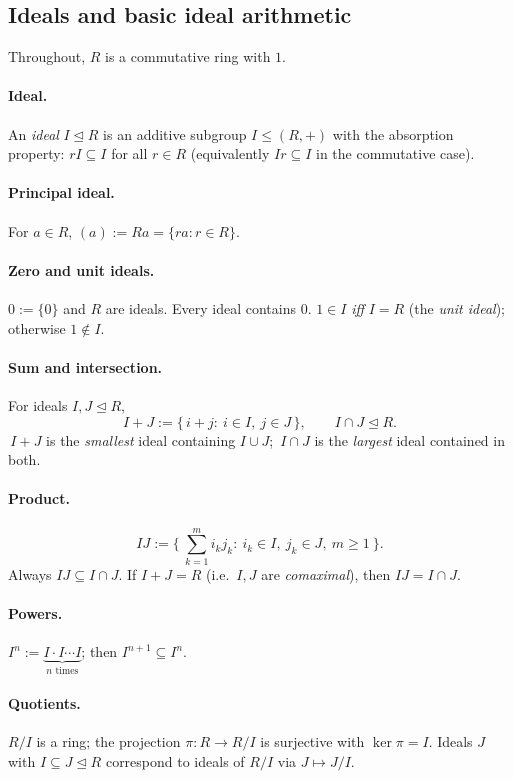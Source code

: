 \documentclass[12pt]{article}
\begin{document}
\subsection{Ideals and basic ideal arithmetic}
Throughout, $R$ is a commutative ring with $1$.

\paragraph{Ideal.}
An \emph{ideal} $I\unlhd R$ is an additive subgroup $I\le (R,+)$ with the absorption property:
$rI\subseteq I$ for all $r\in R$ (equivalently $Ir\subseteq I$ in the commutative case).

\paragraph{Principal ideal.}
For $a\in R$, $(a):=Ra=\{ra:r\in R\}$.

\paragraph{Zero and unit ideals.}
$0:=\{0\}$ and $R$ are ideals. Every ideal contains $0$.  
$1\in I$ \emph{iff} $I=R$ (the \emph{unit ideal}); otherwise $1\notin I$.

\paragraph{Sum and intersection.}
For ideals $I,J\unlhd R$,
\[
I+J:=\{\,i+j:\ i\in I,\ j\in J\,\},\qquad I\cap J\unlhd R.
\]
$\,I+J$ is the \emph{smallest} ideal containing $I\cup J$; $\,I\cap J$ is the \emph{largest} ideal contained in both.

\paragraph{Product.}
\[
IJ:=\Big\{\ \sum_{k=1}^m i_k j_k:\ i_k\in I,\ j_k\in J,\ m\ge1\ \Big\}.
\]
Always $IJ\subseteq I\cap J$. If $I+J=R$ (i.e.\ $I,J$ are \emph{comaximal}), then $IJ=I\cap J$.

\paragraph{Powers.}
$I^n:=\underbrace{I\cdot I\cdots I}_{n\text{ times}}$; then $I^{n+1}\subseteq I^n$.

\paragraph{Quotients.}
$R/I$ is a ring; the projection $\pi:R\to R/I$ is surjective with $\ker\pi=I$.  
Ideals $J$ with $I\subseteq J\unlhd R$ correspond to ideals of $R/I$ via $J\mapsto J/I$.
\end{document}
